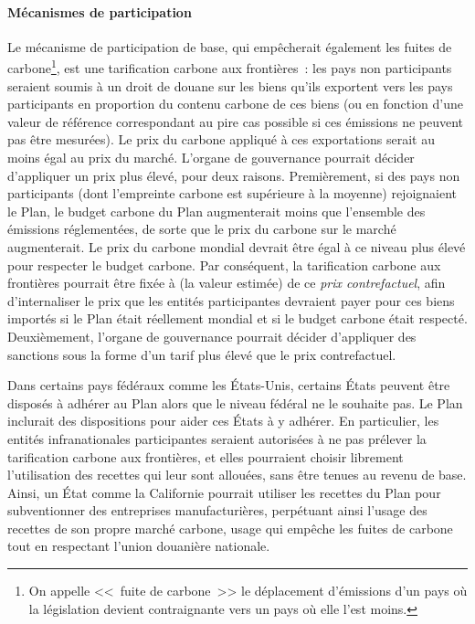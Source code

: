 \documentclass[a5paper,french,openany]{memoir}
\begin{document}
\paragraph{Mécanismes de participation}

Le mécanisme de participation de base, qui empêcherait également les fuites de carbone\footnote{On appelle <<~fuite de carbone~>> le déplacement d'émissions d'un pays où la législation devient contraignante vers un pays où elle l'est moins.}, est une tarification carbone aux frontières~: les pays non participants seraient soumis à un droit de douane sur les biens qu'ils exportent vers les pays participants en proportion du contenu carbone de ces biens (ou en fonction d'une valeur de référence correspondant au pire cas possible si ces émissions ne peuvent pas être mesurées). Le prix du carbone appliqué à ces exportations serait au moins égal au prix du marché. L'organe de gouvernance pourrait décider d'appliquer un prix plus élevé, pour deux raisons. Premièrement, si des pays non participants (dont l'empreinte carbone est supérieure à la moyenne) rejoignaient le Plan, le budget carbone du Plan augmenterait moins que l'ensemble des émissions réglementées, de sorte que le prix du carbone sur le marché augmenterait. Le prix du carbone mondial devrait être égal à ce niveau plus élevé pour respecter le budget carbone. Par conséquent, la tarification carbone aux frontières pourrait être fixée à (la valeur estimée) de ce \textit{prix contrefactuel}, afin d'internaliser le prix que les entités participantes devraient payer pour ces biens importés si le Plan était réellement mondial et si le budget carbone était respecté. Deuxièmement, l'organe de gouvernance pourrait décider d'appliquer des sanctions sous la forme d'un tarif plus élevé que le prix contrefactuel. 

Dans certains pays fédéraux comme les États-Unis, certains États peuvent être disposés à adhérer au Plan alors que le niveau fédéral ne le souhaite pas. Le Plan inclurait des dispositions pour aider ces États à y adhérer. En particulier, les entités infranationales participantes seraient autorisées à ne pas prélever la tarification carbone aux frontières, et elles pourraient choisir librement l'utilisation des recettes qui leur sont allouées, sans être tenues au revenu de base. 
Ainsi, un État comme la Californie pourrait utiliser les recettes du Plan pour subventionner des entreprises manufacturières, perpétuant ainsi l'usage des recettes de son propre marché carbone, usage qui empêche les fuites de carbone tout en respectant l'union douanière nationale.
\end{document}
